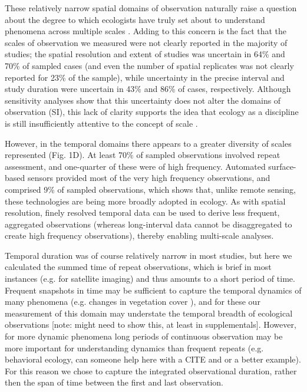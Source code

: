 \documentclass[12pt]{article}
\begin{document}
These relatively narrow spatial domains of observation naturally raise a question about the degree to which ecologists have truly set about to understand phenomena across multiple scales \cite{levin_problem_1992}.  Adding to this concern is the fact that the scales of observation we measured were not clearly reported in the majority of studies; the spatial resolution and extent of studies was uncertain in 64\% and 70\% of sampled cases (and even the number of spatial replicates was not clearly reported for 23\% of the sample), while uncertainty in the precise interval and study duration were uncertain in 43\% and 86\% of cases, respectively.  Although sensitivity analyses show that this uncertainty does not alter the domains of observation (SI), this lack of clarity supports the idea that ecology as a discipline is still insufficiently attentive to the concept of scale \cite{chave_problem_2013,wheatley_factors_2009}.  

However, in the temporal domains there appears to a greater diversity of scales represented (Fig. 1D). At least 70\% of sampled observations involved repeat assessment, and one-quarter of these were of high frequency. Automated surface-based sensors provided most of the very high frequency observations, and comprised 9\% of sampled observations, which shows that, unlike remote sensing, these technologies are being more broadly adopted in ecology. As with spatial resolution, finely resolved temporal data can be used to derive less frequent, aggregated observations (whereas long-interval data cannot be disaggregated to create high frequency observations), thereby enabling multi-scale analyses. 

Temporal duration was of course relatively narrow in most studies, but here we calculated the summed time of repeat observations, which is brief in most instances (e.g. for satellite imaging) and thus amounts to a short period of time. Frequent snapshots in time may be sufficient to capture the temporal dynamics of many phenomena (e.g. changes in vegetation cover \cite{hansen_high-resolution_2013}), and for these our measurement of this domain may understate the temporal breadth of ecological observations [note: might need to show this, at least in supplementals]. However, for more dynamic phenomena long periods of continuous observation may be more important for understanding dynamics than frequent repeats (e.g. behavioral ecology, can someone help here with a CITE and or a better example). For this reason we chose to capture the integrated observational duration, rather then the span of time between the first and last observation. 
\end{document}
